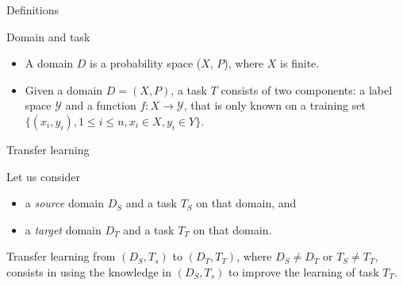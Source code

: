\documentclass[xcolor=pdftex,dvipsnames,table,mathserif]{beamer}
\begin{document}
\begin{frame}{Definitions \cite{pan_survey_2010}}

\begin{block}{Domain and task}

\begin{itemize}
\item A domain $D$ is a probability space ($X$, $P$), where $X$ is finite.

\item Given a domain $D = (X, P)$, a task $T$ consists
of two components: a label space $\mathcal{Y}$ and a
function $f: X \rightarrow \mathcal{Y}$, that is only known on a training set
$\{(x_i, y_i), 1 \leq i \leq n, x_i \in X,  y_i \in Y\}$.

\end{itemize}

\end{block}

\pause

\begin{block}{Transfer learning}

  Let us consider

  \begin{itemize}
  \item a \emph{source} domain $D_S$ and a task $T_S$ on that domain, and
  \item a \emph{target} domain $D_T$ and a task $T_T$ on that domain.
  \end{itemize}

Transfer learning from $(D_S, T_s)$ to $(D_T, T_T)$, where $D_S \neq D_T$ or $T_S \neq T_T$,  consists in using the knowledge in $(D_S, T_s)$ to improve the learning of task $T_T$.

\end{block}


\end{frame}
\end{document}
